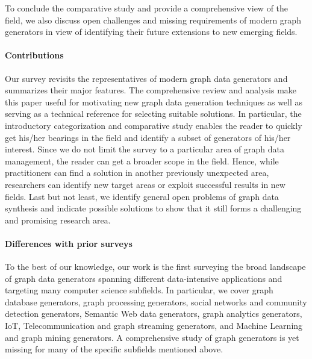 To conclude the comparative study and provide a comprehensive view of the
field,  we also discuss open challenges and missing requirements of modern
graph generators in view of identifying their future extensions to new emerging fields.


\paragraph*{Contributions} Our survey revisits the representatives of
modern graph data generators and summarizes their major features. The comprehensive review and analysis make this paper useful for motivating new graph data generation techniques as well as serving as a technical reference for selecting suitable solutions. In particular, the introductory categorization and comparative study enables the reader to quickly get his/her bearings in the field and identify a subset of generators of his/her interest. Since we do not limit the survey to a particular area of graph data management,  the reader can get a broader scope in the field. Hence, while practitioners can find a solution in another previously unexpected area, researchers can identify new target areas or exploit successful results in new fields.  Last but not least, we identify general open problems of graph data synthesis and indicate possible solutions to show that it still forms a challenging and promising research area.

\paragraph*{Differences with prior surveys}

To the best of our knowledge, our work is the first surveying the broad
landscape of graph data generators spanning different data-intensive applications and
targeting many computer science subfields. In particular, we cover graph database
generators, graph processing generators, social networks and community detection
generators, Semantic Web data generators, graph
analytics generators, IoT, Telecommunication and graph streaming generators,
and Machine Learning and graph mining generators. A comprehensive study of
graph generators is yet missing for many of the specific subfields mentioned
above.

